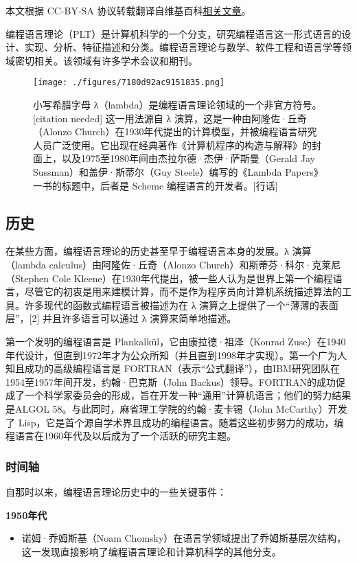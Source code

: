 
本文根据 CC-BY-SA 协议转载翻译自维基百科\href{https://en.wikipedia.org/wiki/Programming_language_theory}{相关文章}。

编程语言理论（PLT）是计算机科学的一个分支，研究编程语言这一形式语言的设计、实现、分析、特征描述和分类。编程语言理论与数学、软件工程和语言学等领域密切相关。该领域有许多学术会议和期刊。
\begin{figure}[ht]
\centering
\texttt{[image: ./figures/7180d92ac9151835.png]}
\caption{小写希腊字母 λ（lambda）是编程语言理论领域的一个非官方符号。[citation needed] 这一用法源自 λ 演算，这是一种由阿隆佐·丘奇（Alonzo Church）在1930年代提出的计算模型，并被编程语言研究人员广泛使用。它出现在经典著作《计算机程序的构造与解释》的封面上，以及1975至1980年间由杰拉尔德·杰伊·萨斯曼（Gerald Jay Sussman）和盖伊·斯蒂尔（Guy Steele）编写的《Lambda Papers》一书的标题中，后者是 Scheme 编程语言的开发者。[行话]} \label{fig_BCYY_1}
\end{figure}
\subsection{历史}  
在某些方面，编程语言理论的历史甚至早于编程语言本身的发展。λ 演算（lambda calculus）由阿隆佐·丘奇（Alonzo Church）和斯蒂芬·科尔·克莱尼（Stephen Cole Kleene）在1930年代提出，被一些人认为是世界上第一个编程语言，尽管它的初衷是用来建模计算，而不是作为程序员向计算机系统描述算法的工具。许多现代的函数式编程语言被描述为在 λ 演算之上提供了一个“薄薄的表面层”，[2] 并且许多语言可以通过 λ 演算来简单地描述。

第一个发明的编程语言是 Plankalkül，它由康拉德·祖泽（Konrad Zuse）在1940年代设计，但直到1972年才为公众所知（并且直到1998年才实现）。第一个广为人知且成功的高级编程语言是 FORTRAN（表示“公式翻译”），由IBM研究团队在1954至1957年间开发，约翰·巴克斯（John Backus）领导。FORTRAN的成功促成了一个科学家委员会的形成，旨在开发一种“通用”计算机语言；他们的努力结果是ALGOL 58。与此同时，麻省理工学院的约翰·麦卡锡（John McCarthy）开发了 Lisp，它是首个源自学术界且成功的编程语言。随着这些初步努力的成功，编程语言在1960年代及以后成为了一个活跃的研究主题。
\subsubsection{时间轴}  
自那时以来，编程语言理论历史中的一些关键事件：

\textbf{1950年代}  
\begin{itemize}
\item 诺姆·乔姆斯基（Noam Chomsky）在语言学领域提出了乔姆斯基层次结构，这一发现直接影响了编程语言理论和计算机科学的其他分支。
\end{itemize}


